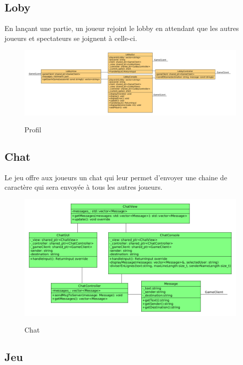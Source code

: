 \documentclass[../design_fonctionnement_sys.tex]{subfiles}
\begin{document}
\newpage
\subsection{Loby}
En lançant une partie, un joueur rejoint le lobby en attendant que les autres joueurs et spectateurs se joignent à celle-ci. \begin{figure}[H]
    \centering
    \includegraphics[scale=0.3]{img_design/4.6_lobby_design.png}
    \label{fig:seq_match_server}
    \caption{Profil}
\end{figure}

\subsection{Chat}
Le jeu offre aux joueurs un chat qui leur permet d'envoyer une chaine de caractère qui sera envoyée à tous les autres joueurs. 
\begin{figure}[H]
    \centering
    \includegraphics[scale=0.3]{img_design/4.7_chat_design.png}
    \label{fig:seq_match_server}
    \caption{Chat}
\end{figure}

\newpage
\subsection{Jeu}
\end{document}
